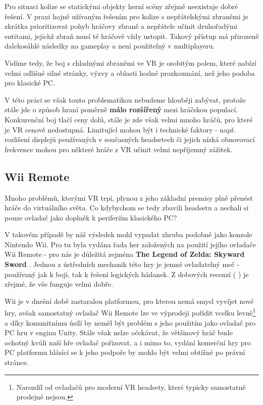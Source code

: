 Pro situaci kolize se statickými objekty herní scény zřejmě neexistuje dobré řešení. V praxi hojně užívaným řešením pro kolize s nepřátelskými zbraněmi je zkrátka prioritizovat pohyb hráčovy zbraně a nepřátele učinit druhořadými entitami, jejichž zbraň musí té hráčově vždy ustopit. Takový přístup má přirozeně dalekosáhlé následky na gameplay a není použitelný v multiplayeru. 

Vidíme tedy, že boj s chladnými zbraněmi ve \acs{VR} je osobitým polem, které nabízí velmi odlišné silné stránky, výzvy a oblasti hodné prozkoumání, než jeho podoba pro klasické PC.

V této práci se však touto problematikou nebudeme hlouběji zabývat, protože stále jde o způsob hraní poměrně \textbf{málo rozšířený} mezi hráčskou populací. Konkurenční boj tlačí ceny dolů, stále je zde však velmi mnoho hráčů, pro které je \acs{VR} cenově nedostupná. Limitující mohou být i technické faktory - např. rozlišení displejů používaných v současných headsetech či jejich nízká obnovovací frekvence mohou pro některé hráče z \acs{VR} učinit velmi nepříjemný zážitek. 

\subsection{Wii Remote}

Mnoho problémů, kterými \acs{VR} trpí, plynou z jeho základní premisy plně přenést hráče do virtuálního světa. Co kdybychom se tedy zbavili headsetu a nechali si pouze ovladač jako doplněk k periferiím klasického PC?

V takovém případě by náš výsledek mohl vypadat zhruba podobně jako konzole Nintendo Wii. Pro tu byla vydána řada her založených na použití jejího ovladače Wii Remote - pro nás je důležitá zejména \textbf{The Legend of Zelda: Skyward Sword} \cite{ZeldaSkywardSword}. Jednou z ústředních mechanik této hry je jemně ovladatelný meč - používaný jak k boji, tak k řešení logických hádanek. Z dobových recenzí (\cite{SkywardReviewNintendolife} \cite{SkywardReviewIgn}) je zřejmé, že vše funguje velmi dobře. 

Wii je v dnešní době zastaralou platformou, pro kterou nemá smysl vyvíjet nové hry, avšak samostatný ovladač Wii Remote lze ve výprodeji pořídit vcelku levně\footnote{Narozdíl od ovladačů pro moderní VR headsety, které typicky samostatně prodejné nejsou.} a díky komunitnímu úsilí \cite{WiiRemoteUnityAPI} by neměl být problém s jeho použitím jako ovladač pro PC hru v enginu Unity. Stále však nelze očekávat, že většinový hráč bude ochotný kvůli naší hře ovladač pořizovat, a i mimo to, vydání komerční hry pro PC platformu hlásící se k jeho podpoře by mohlo být velmi obtížné po právní stránce.

